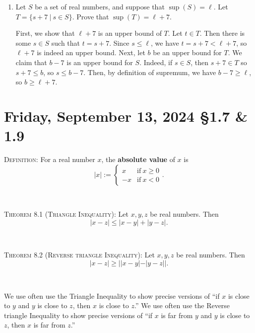 \documentclass[12pt]{amsart}
\def\Fr{Friday}
\numberwithin{equation}{section}
\theoremstyle{plain} %
\newcommand{\Sept}[3]{\section{#2, September #1, 2024 \quad \S#3}}
\theoremstyle{definition}
\theoremstyle{remark}
\begin{document}
\begin{enumerate}
\

\item Let $S$ be a set of real numbers, and suppose that $\sup(S)=\ell$. Let ${T={\{s+7 \ | \ s\in S\}}}$. Prove that ${\sup(T) = \ell + 7}$.

\begin{framed}
First, we show that $\ell+7$ is an upper bound of $T$. Let $t\in T$. Then there is some $s\in S$ such that $t=s+7$. Since $s\leq \ell$, we have $t=s+7 < \ell+7$, so $\ell+7$ is indeed an upper bound. Next, let $b$ be an upper bound for $T$. We claim that $b-7$ is an upper bound for $S$. Indeed, if $s\in S$, then $s+7\in T$ so $s+7 \leq b$, so $s\leq b-7$. Then, by definition of supremum, we have $b-7\geq \ell$, so $b\geq \ell+7$.
\end{framed}

\end{enumerate}




\newpage

\Sept{13}{\Fr}{1.7 \& 1.9}

\begin{framed}
\noindent \textsc{Definition:} For a real number $x$, the \textbf{absolute value} of $x$ is 
\[|x| := \begin{cases} x &\text{if} \ x\geq 0 \\ -x &\text{if} \ x< 0 \end{cases}.\]

\

\noindent \textsc{Theorem 8.1 (Triangle Inequality):} Let $x,y,z$ be real numbers. Then 
\[ |x-z| \leq |x-y| + |y-z|.\]

\

\noindent \textsc{Theorem 8.2 (Reverse triangle Inequality):} Let $x,y,z$ be real numbers. Then 
\[ |x-z| \geq ||x-y| - |y-z||.\] 

\

\noindent We use often use the Triangle Inequality to show precise versions of ``if $x$ is close to $y$ and $y$ is close to $z$, then $x$ is close to $z$.'' We use often use the Reverse triangle Inequality to show precise versions of ``if $x$ is far from $y$ and $y$ is close to $z$, then $x$ is far from $z$.''
\end{framed}
\end{document}
